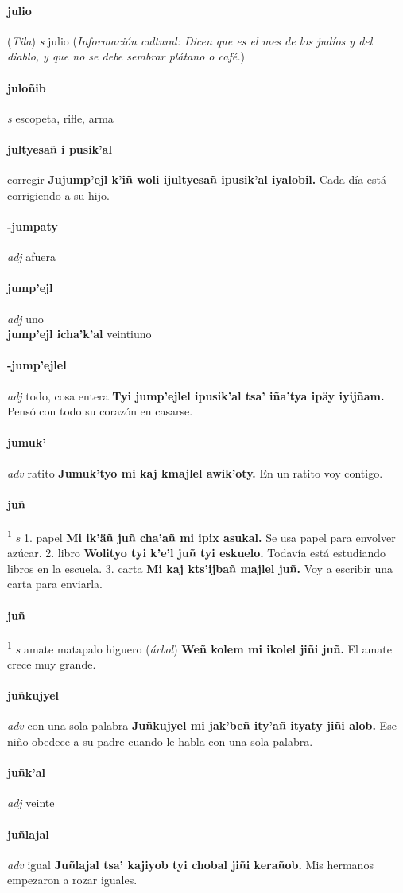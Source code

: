\documentclass{scrbook}
\newcommand{\entry}[1]{\paragraph{#1}}
\newcommand{\onedefinition}[1]{#1.}
\newcommand{\defsuperscript}[1]{\textsuperscript{1}}
\newcommand{\partofspeech}[1]{\textit{#1}}
\newcommand{\spanishtranslation}[1]{#1}
\newcommand{\clarification}[1]{(\textit{#1})}
\newcommand{\cholexample}[1]{\textbf{#1}}
\newcommand{\exampletranslation}[1]{#1}
\newcommand{\relevantdialect}[1]{(\textit{#1})}
\newcommand{\culturalinformation}[1]{(\textit{#1})}
\newcommand{\secondaryentry}[1]{\\\textbf{#1}}
\newcommand{\secondtranslation}[1]{#1}
\begin{document}
\begin{multicols}{2}
\entry{julio}
\relevantdialect{Tila}
\partofspeech{s}
\spanishtranslation{julio}
\culturalinformation{Información cultural: Dicen que es el mes de los judíos y del diablo, y que no se debe sembrar plátano o café.}

\entry{juloñib}
\partofspeech{s}
\spanishtranslation{escopeta, rifle, arma}

\entry{jultyesañ i pusik'al}
\spanishtranslation{corregir}
\cholexample{Jujump'ejl k'iñ woli ijultyesañ ipusik'al iyalobil.}
\exampletranslation{Cada día está corrigiendo a su hijo.}

\entry{-jumpaty}
\partofspeech{adj}
\spanishtranslation{afuera}

\entry{jump'ejl}
\partofspeech{adj}
\spanishtranslation{uno}
\secondaryentry{jump'ejl icha'k'al}
\secondtranslation{veintiuno}

\entry{-jump'ejlel}
\partofspeech{adj}
\spanishtranslation{todo, cosa entera}
\cholexample{Tyi jump'ejlel ipusik'al tsa' iña'tya ipäy iyijñam.}
\exampletranslation{Pensó con todo su corazón en casarse.}

\entry{jumuk'}
\partofspeech{adv}
\spanishtranslation{ratito}
\cholexample{Jumuk'tyo mi kaj kmajlel awik'oty.}
\exampletranslation{En un ratito voy contigo.}

\entry{juñ}
\defsuperscript{1}
\partofspeech{s}
\onedefinition{1}
\spanishtranslation{papel}
\cholexample{Mi ik'äñ juñ cha'añ mi ipix asukal.}
\exampletranslation{Se usa papel para envolver azúcar.}
\onedefinition{2}
\spanishtranslation{libro}
\cholexample{Wolityo tyi k'e'l juñ tyi eskuelo.}
\exampletranslation{Todavía está estudiando libros en la escuela.}
\onedefinition{3}
\spanishtranslation{carta}
\cholexample{Mi kaj kts'ijbañ majlel juñ.}
\exampletranslation{Voy a escribir una carta para enviarla.}

\entry{juñ}
\defsuperscript{2}
\partofspeech{s}
\spanishtranslation{amate}
\spanishtranslation{matapalo}
\spanishtranslation{higuero}
\clarification{árbol}
\cholexample{Weñ kolem mi ikolel jiñi juñ.}
\exampletranslation{El amate crece muy grande.}

\entry{juñkujyel}
\partofspeech{adv}
\spanishtranslation{con una sola palabra}
\cholexample{Juñkujyel mi jak'beñ ity'añ ityaty jiñi alob.}
\exampletranslation{Ese niño obedece a su padre cuando le habla con una sola palabra.}

\entry{juñk'al}
\partofspeech{adj}
\spanishtranslation{veinte}

\entry{juñlajal}
\partofspeech{adv}
\spanishtranslation{igual}
\cholexample{Juñlajal tsa' kajiyob tyi chobal jiñi kerañob.}
\exampletranslation{Mis hermanos empezaron a rozar iguales.}


\end{multicols}
\end{document}
